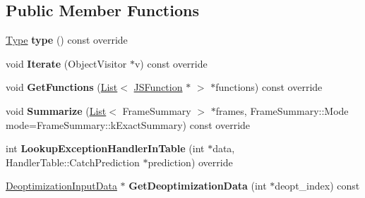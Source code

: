 \subsection*{Public Member Functions}
\begin{DoxyCompactItemize}
\item 
\hyperlink{classv8_1_1internal_1_1_type}{Type} {\bfseries type} () const  override\hypertarget{classv8_1_1internal_1_1_optimized_frame_a0dc7d112ae98990fe39454ba207c21a9}{}\label{classv8_1_1internal_1_1_optimized_frame_a0dc7d112ae98990fe39454ba207c21a9}

\item 
void {\bfseries Iterate} (Object\+Visitor $\ast$v) const  override\hypertarget{classv8_1_1internal_1_1_optimized_frame_a60001a1bd437cd9a822ed194ac69899e}{}\label{classv8_1_1internal_1_1_optimized_frame_a60001a1bd437cd9a822ed194ac69899e}

\item 
void {\bfseries Get\+Functions} (\hyperlink{classv8_1_1internal_1_1_list}{List}$<$ \hyperlink{classv8_1_1internal_1_1_j_s_function}{J\+S\+Function} $\ast$ $>$ $\ast$functions) const  override\hypertarget{classv8_1_1internal_1_1_optimized_frame_a1af6e3193123528e1dec97469315d8a1}{}\label{classv8_1_1internal_1_1_optimized_frame_a1af6e3193123528e1dec97469315d8a1}

\item 
void {\bfseries Summarize} (\hyperlink{classv8_1_1internal_1_1_list}{List}$<$ Frame\+Summary $>$ $\ast$frames, Frame\+Summary\+::\+Mode mode=Frame\+Summary\+::k\+Exact\+Summary) const  override\hypertarget{classv8_1_1internal_1_1_optimized_frame_aade8f9c8d1beb7ac78b914febf0e8b65}{}\label{classv8_1_1internal_1_1_optimized_frame_aade8f9c8d1beb7ac78b914febf0e8b65}

\item 
int {\bfseries Lookup\+Exception\+Handler\+In\+Table} (int $\ast$data, Handler\+Table\+::\+Catch\+Prediction $\ast$prediction) override\hypertarget{classv8_1_1internal_1_1_optimized_frame_aab3a9c1c4cbdec62a14f3c6ded471dd6}{}\label{classv8_1_1internal_1_1_optimized_frame_aab3a9c1c4cbdec62a14f3c6ded471dd6}

\item 
\hyperlink{classv8_1_1internal_1_1_deoptimization_input_data}{Deoptimization\+Input\+Data} $\ast$ {\bfseries Get\+Deoptimization\+Data} (int $\ast$deopt\+\_\+index) const \hypertarget{classv8_1_1internal_1_1_optimized_frame_a2f166f13dc557b1336b177a397f2ddf2}{}\label{classv8_1_1internal_1_1_optimized_frame_a2f166f13dc557b1336b177a397f2ddf2}

\end{DoxyCompactItemize}
